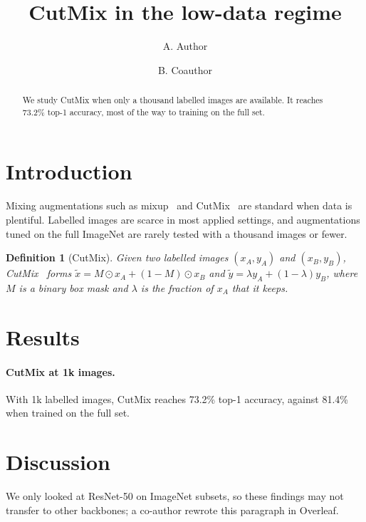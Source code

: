 \documentclass[11pt]{article}
\title{CutMix in the low-data regime}
\author{A. Author \and B. Coauthor}
\date{}
\newtheorem{definition}{Definition}
\begin{document}
\maketitle

\begin{abstract}
We study CutMix when only a thousand labelled images are available. It reaches 73.2\% top-1
accuracy, most of the way to training on the full set.
\end{abstract}

\section{Introduction}

Mixing augmentations such as mixup~\cite{zhang2018mixup} and CutMix~\cite{yun2019cutmix} are standard
when data is plentiful.
Labelled images are scarce in most applied settings, and augmentations tuned on the full ImageNet
are rarely tested with a thousand images or fewer.

\begin{definition}[CutMix]\label{def:cutmix}
Given two labelled images $(x_A, y_A)$ and $(x_B, y_B)$, CutMix~\cite{yun2019cutmix} forms
$\tilde{x} = M \odot x_A + (1 - M) \odot x_B$ and $\tilde{y} = \lambda y_A + (1 - \lambda) y_B$,
where $M$ is a binary box mask and $\lambda$ is the fraction of $x_A$ that it keeps.
\end{definition}



\section{Results}

\paragraph{CutMix at 1k images.}
With 1k labelled images, CutMix reaches 73.2\% top-1 accuracy, against 81.4\% when trained on the
full set.

\section{Discussion}

We only looked at ResNet-50 on ImageNet subsets, so these findings may not transfer to other
backbones; a co-author rewrote this paragraph in Overleaf.



\end{document}
